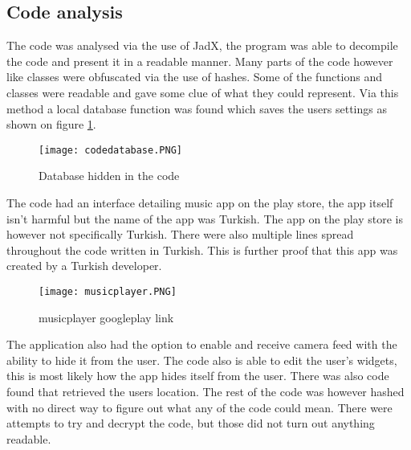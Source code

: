 \subsection{Code analysis}

The code was analysed via the use of JadX, the program was able to decompile the code and present it in a readable manner. 
Many parts of the code however like classes were obfuscated via the use of hashes. 
Some of the functions and classes were readable and gave some clue of what they could represent. 
Via this method a local database function was found which saves the users settings as shown on figure \ref{tim-database}.

\begin{figure}[H]
    \texttt{[image: codedatabase.PNG]}
    \caption{Database hidden in the code}
    \label{tim-database}
\end{figure}

The code had an interface detailing music app on the play store, the app itself isn’t harmful but the name of the app was Turkish. 
The app on the play store is however not specifically Turkish. 
There were also multiple lines spread throughout the code written in Turkish. 
This is further proof that this app was created by a Turkish developer.

\begin{figure}[H]
    \texttt{[image: musicplayer.PNG]}
    \caption{musicplayer googleplay link}
    \label{tim-music}
\end{figure}

The application also had the option to enable and receive camera feed with the ability to hide it from the user. 
The code also is able to edit the user’s widgets, this is most likely how the app hides itself from the user. 
There was also code found that retrieved the users location. 
The rest of the code was however hashed with no direct way to figure out what any of the code could mean. 
There were attempts to try and decrypt the code, but those did not turn out anything readable.

